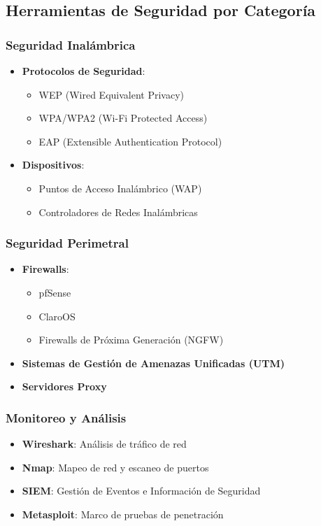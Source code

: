 \documentclass[12pt,a4paper]{article}
\begin{document}
\subsection{Herramientas de Seguridad por Categoría}

\subsubsection{Seguridad Inalámbrica}
\begin{itemize}
    \item \textbf{Protocolos de Seguridad}:
    \begin{itemize}
        \item WEP (Wired Equivalent Privacy)
        \item WPA/WPA2 (Wi-Fi Protected Access)
        \item EAP (Extensible Authentication Protocol)
    \end{itemize}
    \item \textbf{Dispositivos}:
    \begin{itemize}
        \item Puntos de Acceso Inalámbrico (WAP)
        \item Controladores de Redes Inalámbricas
    \end{itemize}
\end{itemize}

\subsubsection{Seguridad Perimetral}
\begin{itemize}
    \item \textbf{Firewalls}:
    \begin{itemize}
        \item pfSense
        \item ClaroOS
        \item Firewalls de Próxima Generación (NGFW)
    \end{itemize}
    \item \textbf{Sistemas de Gestión de Amenazas Unificadas (UTM)}
    \item \textbf{Servidores Proxy}
\end{itemize}

\subsubsection{Monitoreo y Análisis}
\begin{itemize}
    \item \textbf{Wireshark}: Análisis de tráfico de red
    \item \textbf{Nmap}: Mapeo de red y escaneo de puertos
    \item \textbf{SIEM}: Gestión de Eventos e Información de Seguridad
    \item \textbf{Metasploit}: Marco de pruebas de penetración
\end{itemize}
\end{document}
